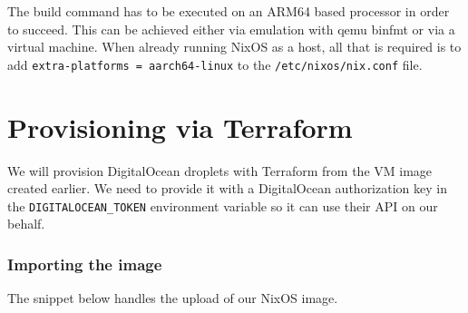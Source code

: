 The build command has to be executed on an ARM64 based processor in
order to succeed. This can be achieved either via emulation with qemu
binfmt or via a virtual machine. When already running NixOS as a host,
all that is required is to add
\texttt{extra-platforms\ =\ aarch64-linux} to the
\texttt{/etc/nixos/nix.conf} file.

\hypertarget{provisioning-via-terraform}{%
\section{Provisioning via Terraform}\label{provisioning-via-terraform}}

We will provision DigitalOcean droplets with Terraform from the VM image
created earlier. We need to provide it with a DigitalOcean authorization
key in the \texttt{DIGITALOCEAN\_TOKEN} environment variable so it can
use their API on our behalf.

\hypertarget{importing-the-image}{%
\subsubsection{Importing the image}\label{importing-the-image}}

The snippet below handles the upload of our NixOS image.

\newpage

\begin{Shaded}
\begin{Highlighting}[]
\NormalTok{\}}


\NormalTok{  \}}
\NormalTok{\}}

\NormalTok{\}}


\NormalTok{    replace\_triggered\_by = [}
\NormalTok{    ]}
\NormalTok{  \}}
\NormalTok{\}}
\end{Highlighting}
\end{Shaded}


